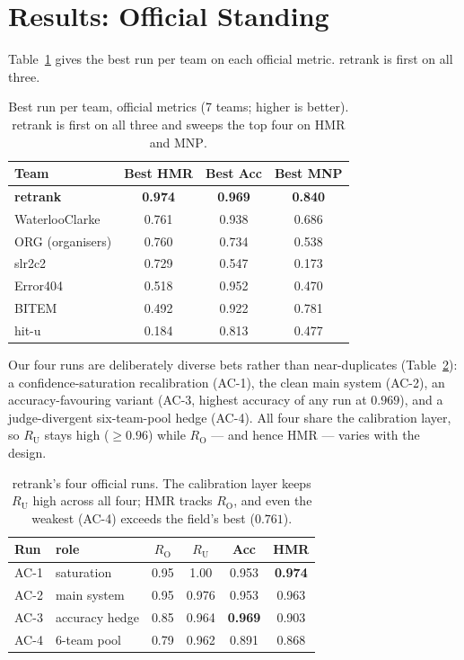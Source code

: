 \documentclass[sigconf,nonacm]{acmart}
\newcommand{\HMR}{\textsc{HMR}}
\newcommand{\MNP}{\textsc{MNP}}
\newcommand{\RO}{R_{\mathrm{O}}}
\newcommand{\RU}{R_{\mathrm{U}}}
\begin{document}
\section{Results: Official Standing}
\label{sec:results}
Table~\ref{tab:standing} gives the best run per team on each official metric. retrank is
first on all three.

\begin{table}[t]
\caption{Best run per team, official metrics (7 teams; higher is better). retrank is first
on all three and sweeps the top four on \HMR{} and \MNP.}
\label{tab:standing}
\small
\begin{tabular}{lccc}
\toprule
Team & Best \HMR & Best Acc & Best \MNP \\
\midrule
\textbf{retrank}      & \textbf{0.974} & \textbf{0.969} & \textbf{0.840} \\
WaterlooClarke        & 0.761 & 0.938 & 0.686 \\
ORG (organisers)      & 0.760 & 0.734 & 0.538 \\
slr2c2                & 0.729 & 0.547 & 0.173 \\
Error404              & 0.518 & 0.952 & 0.470 \\
BITEM                 & 0.492 & 0.922 & 0.781 \\
hit-u                 & 0.184 & 0.813 & 0.477 \\
\bottomrule
\end{tabular}
\end{table}

Our four runs are deliberately diverse bets rather than near-duplicates
(Table~\ref{tab:retrankruns}): a confidence-saturation recalibration (AC-1), the clean main
system (AC-2), an accuracy-favouring variant (AC-3, highest accuracy of any run at $0.969$),
and a judge-divergent six-team-pool hedge (AC-4). All four share the calibration layer, so
$\RU$ stays high ($\ge0.96$) while $\RO$ --- and hence \HMR{} --- varies with the design.

\begin{table}[t]
\caption{retrank's four official runs. The calibration layer keeps $\RU$ high across all
four; \HMR{} tracks $\RO$, and even the weakest (AC-4) exceeds the field's best ($0.761$).}
\label{tab:retrankruns}
\centering\small
\begin{tabular}{llcccc}
\toprule
Run & role & $\RO$ & $\RU$ & Acc & \HMR \\
\midrule
AC-1 & saturation & 0.95 & 1.00 & 0.953 & \textbf{0.974} \\
AC-2 & main system & 0.95 & 0.976 & 0.953 & 0.963 \\
AC-3 & accuracy hedge & 0.85 & 0.964 & \textbf{0.969} & 0.903 \\
AC-4 & 6-team pool & 0.79 & 0.962 & 0.891 & 0.868 \\
\bottomrule
\end{tabular}
\end{table}
\end{document}
